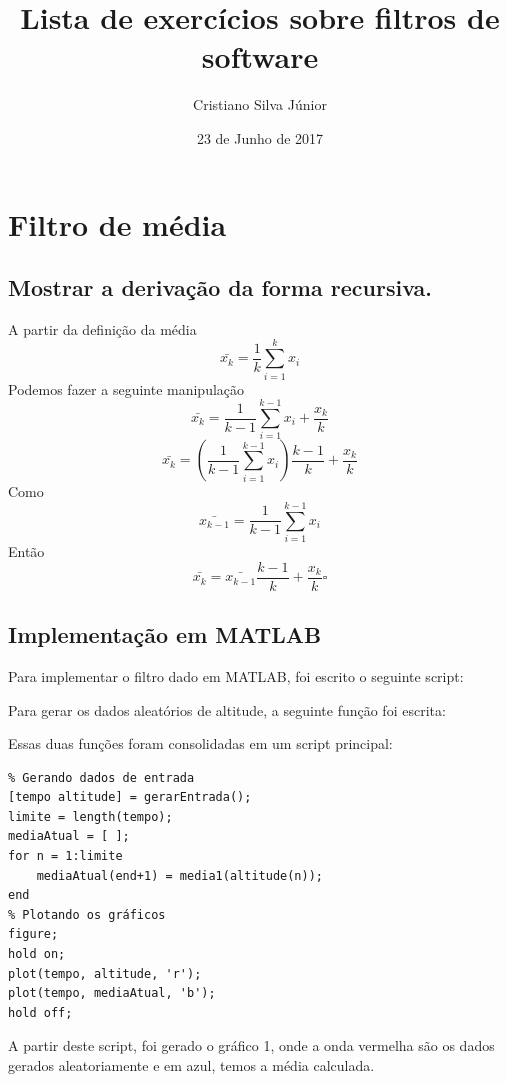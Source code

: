 \documentclass[12pt, a4paper, twoside]{article}
\begin{document}
\title{Lista de exercícios sobre filtros de software}
\author{Cristiano Silva Júnior}
\date{23 de Junho de 2017}
\maketitle

\section{Filtro de média}

\subsection{Mostrar a derivação da forma recursiva.}

A partir da definição da média
$$\bar{x_k}=\frac{1}{k}\sum^{k}_{i=1}{x_i}$$
Podemos fazer a seguinte manipulação
$$\bar{x_k}=\frac{1}{k-1}\sum^{k-1}_{i=1}{x_i}+\frac{x_k}{k}$$
$$\bar{x_k}=(\frac{1}{k-1}\sum^{k-1}_{i=1}{x_i})\frac{k-1}{k}+\frac{x_k}{k}$$
Como
$$\bar{x_{k-1}}=\frac{1}{k-1}\sum^{k-1}_{i=1}{x_i}$$
Então
$$\bar{x_k}=\bar{x_{k-1}}\frac{k-1}{k}+\frac{x_k}{k}\square$$

\subsection{Implementação em MATLAB}

Para implementar o filtro dado em MATLAB, foi escrito o seguinte script:



Para gerar os dados aleatórios de altitude, a seguinte função foi escrita:



Essas duas funções foram consolidadas em um script principal:

\begin{lstlisting}
% Gerando dados de entrada
[tempo altitude] = gerarEntrada();
limite = length(tempo);
mediaAtual = [ ];
for n = 1:limite
    mediaAtual(end+1) = media1(altitude(n));
end
% Plotando os gráficos
figure;
hold on;
plot(tempo, altitude, 'r');
plot(tempo, mediaAtual, 'b');
hold off;
\end{lstlisting}

A partir deste script, foi gerado o gráfico 1, onde a onda vermelha são os dados gerados aleatoriamente e em azul, temos a  média calculada.
\end{document}

